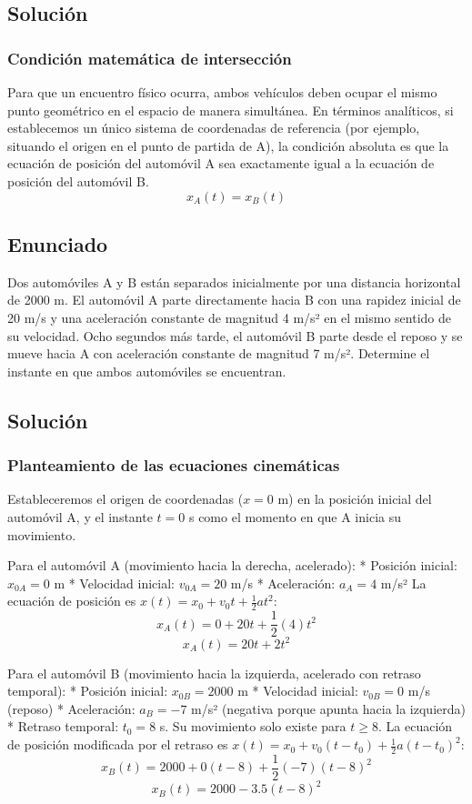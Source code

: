 \documentclass[12pt, a4paper]{article}
\begin{document}
\subsection*{Solución}

\subsubsection*{Condición matemática de intersección}
Para que un encuentro físico ocurra, ambos vehículos deben ocupar el mismo punto geométrico en el espacio de manera simultánea. En términos analíticos, si establecemos un único sistema de coordenadas de referencia (por ejemplo, situando el origen en el punto de partida de A), la condición absoluta es que la ecuación de posición del automóvil A sea exactamente igual a la ecuación de posición del automóvil B. 
$$x_A(t) = x_B(t)$$

\newpage
\subsection*{Enunciado}
Dos automóviles A y B están separados inicialmente por una distancia horizontal de 2000 m. El automóvil A parte directamente hacia B con una rapidez inicial de 20 m/s y una aceleración constante de magnitud 4 m/s² en el mismo sentido de su velocidad. Ocho segundos más tarde, el automóvil B parte desde el reposo y se mueve hacia A con aceleración constante de magnitud 7 m/s².
Determine el instante en que ambos automóviles se encuentran.

\subsection*{Solución}

\subsubsection*{Planteamiento de las ecuaciones cinemáticas}
Estableceremos el origen de coordenadas ($x = 0$ m) en la posición inicial del automóvil A, y el instante $t = 0$ s como el momento en que A inicia su movimiento. 

Para el automóvil A (movimiento hacia la derecha, acelerado):
* Posición inicial: $x_{0A} = 0$ m
* Velocidad inicial: $v_{0A} = 20$ m/s
* Aceleración: $a_A = 4$ m/s²
La ecuación de posición es $x(t) = x_0 + v_0 t + \frac{1}{2} a t^2$:
$$x_A(t) = 0 + 20t + \frac{1}{2}(4)t^2$$
$$x_A(t) = 20t + 2t^2$$

Para el automóvil B (movimiento hacia la izquierda, acelerado con retraso temporal):
* Posición inicial: $x_{0B} = 2000$ m
* Velocidad inicial: $v_{0B} = 0$ m/s (reposo)
* Aceleración: $a_B = -7$ m/s² (negativa porque apunta hacia la izquierda)
* Retraso temporal: $t_0 = 8$ s. Su movimiento solo existe para $t \ge 8$.
La ecuación de posición modificada por el retraso es $x(t) = x_0 + v_0(t - t_0) + \frac{1}{2} a (t - t_0)^2$:
$$x_B(t) = 2000 + 0(t - 8) + \frac{1}{2}(-7)(t - 8)^2$$
$$x_B(t) = 2000 - 3.5(t - 8)^2$$
\end{document}
